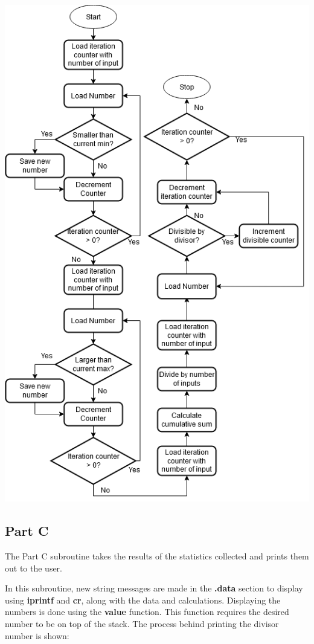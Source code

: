 \documentclass[12pt]{article}
\begin{document}
\begin{center}
\includegraphics[scale = 0.5]{./PartB.PNG}
\end{center}

\subsection{Part C}
The Part C subroutine takes the results of the statistics collected and prints them out to the user. 

In this subroutine, new string messages are made in the \textbf{.data} section to display using \textbf{iprintf} and \textbf{cr}, along with the data and calculations. Displaying the numbers is done using the \textbf{value} function. This function requires the desired number to be on top of the stack. The process behind printing the divisor number is shown:
\end{document}
